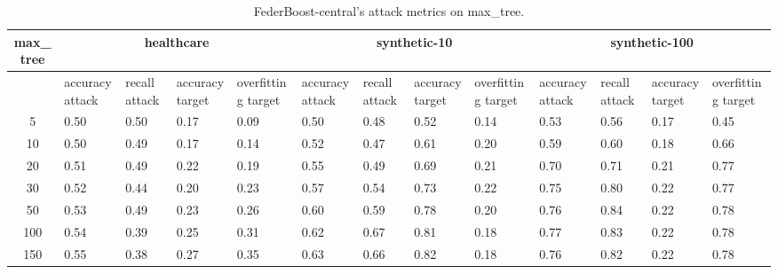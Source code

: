 \begin{table*}[]\centering
\begin{tabular}{|c| *{12}{m{1.0cm}|}}
\hline\rowcolor{gray!50}
\cellcolor{gray!80} max_tree & \multicolumn{4}{c|}{healthcare} & \multicolumn{4}{c|}{synthetic-10} & \multicolumn{4}{c|}{synthetic-100}\\\hline 
& accuracy attack & recall attack & accuracy target & overfitting target & accuracy attack & recall attack & accuracy target & overfitting target & accuracy attack & recall attack & accuracy target & overfitting target\\\hline
5 & 0.50 & 0.50 & 0.17 & 0.09 & 0.50 & 0.48 & 0.52 & 0.14 & 0.53 & 0.56 & 0.17 & 0.45\\ \hline
10 & 0.50 & 0.49 & 0.17 & 0.14 & 0.52 & 0.47 & 0.61 & 0.20 & 0.59 & 0.60 & 0.18 & 0.66\\ \hline
20 & 0.51 & 0.49 & 0.22 & 0.19 & 0.55 & 0.49 & 0.69 & 0.21 & 0.70 & 0.71 & 0.21 & 0.77\\ \hline
30 & 0.52 & 0.44 & 0.20 & 0.23 & 0.57 & 0.54 & 0.73 & 0.22 & 0.75 & 0.80 & 0.22 & 0.77\\ \hline
50 & 0.53 & 0.49 & 0.23 & 0.26 & 0.60 & 0.59 & 0.78 & 0.20 & 0.76 & 0.84 & 0.22 & 0.78\\ \hline
100 & 0.54 & 0.39 & 0.25 & 0.31 & 0.62 & 0.67 & 0.81 & 0.18 & 0.77 & 0.83 & 0.22 & 0.78\\ \hline
150 & 0.55 & 0.38 & 0.27 & 0.35 & 0.63 & 0.66 & 0.82 & 0.18 & 0.76 & 0.82 & 0.22 & 0.78\\ \hline
\end{tabular} 
\caption{FederBoost-central's attack metrics on max_tree.}
\label{tab:experiment1_max_tree}
\end{table*}
